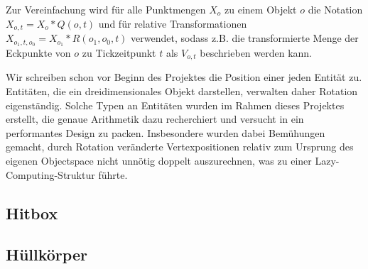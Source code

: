 Zur Vereinfachung wird für alle Punktmengen $X_o$ zu einem Objekt $o$ die Notation $X_{o, t} = X_o * Q(o, t)$ und für relative Transformationen $X_{o_1, t, o_0} = X_{o_1} * R(o_1, o_0, t)$ verwendet, sodass z.B. die transformierte Menge der Eckpunkte von $o$ zu Tickzeitpunkt $t$ als $V_{o,t}$ beschrieben werden kann.

Wir schreiben schon vor Beginn des Projektes die Position einer jeden Entität zu. Entitäten, die ein dreidimensionales Objekt darstellen, verwalten daher Rotation eigenständig. Solche Typen an Entitäten wurden im Rahmen dieses Projektes erstellt, die genaue Arithmetik dazu recherchiert und versucht in ein performantes Design zu packen. Insbesondere wurden dabei Bemühungen gemacht, durch Rotation veränderte Vertexpositionen relativ zum Ursprung des eigenen Objectspace nicht unnötig doppelt auszurechnen, was zu einer Lazy-Computing-Struktur führte.

\subsection{Hitbox}

\subsection{Hüllkörper}



